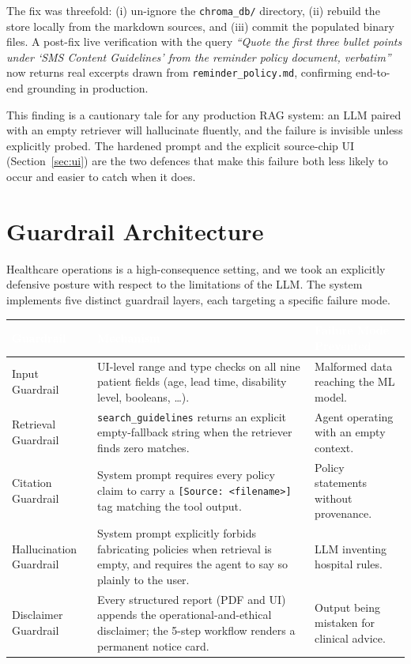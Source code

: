 \documentclass[11pt,a4paper]{article}
\newcommand{\hdrrow}[1]{\textcolor{white}{\textbf{#1}}}
\newcommand{\hdrline}{\rowcolor{navy}}
\begin{document}
The fix was threefold: (i) un-ignore the \texttt{chroma\_db/} directory,
(ii) rebuild the store locally from the markdown sources, and
(iii) commit the populated binary files. A post-fix live verification
with the query \emph{``Quote the first three bullet points under `SMS
Content Guidelines' from the reminder policy document, verbatim''} now
returns real excerpts drawn from \texttt{reminder\_policy.md},
confirming end-to-end grounding in production.

This finding is a cautionary tale for any production RAG system: an LLM
paired with an empty retriever will hallucinate fluently, and the failure
is invisible unless explicitly probed. The hardened prompt and the
explicit source-chip UI (Section~\ref{sec:ui}) are the two defences that
make this failure both less likely to occur and easier to catch when it
does.

\section{Guardrail Architecture}

Healthcare operations is a high-consequence setting, and we took an
explicitly defensive posture with respect to the limitations of the LLM.
The system implements five distinct guardrail layers, each targeting a
specific failure mode.

\begin{tabularx}{\textwidth}{|>{\hsize=0.23\hsize}X|>{\hsize=0.4\hsize}X|X|}
\hline
\hdrline \hdrrow{Guardrail} & \hdrrow{Mechanism} & \hdrrow{Failure Mode Prevented} \\ \hline
Input Guardrail        & UI-level range and type checks on all nine patient fields (age, lead time, disability level, booleans, \ldots).                                          & Malformed data reaching the ML model. \\ \hline
Retrieval Guardrail    & \texttt{search\_guidelines} returns an explicit empty-fallback string when the retriever finds zero matches.                                             & Agent operating with an empty context. \\ \hline
Citation Guardrail     & System prompt requires every policy claim to carry a \texttt{[Source: <filename>]} tag matching the tool output.                                           & Policy statements without provenance. \\ \hline
Hallucination Guardrail & System prompt explicitly forbids fabricating policies when retrieval is empty, and requires the agent to say so plainly to the user.                       & LLM inventing hospital rules. \\ \hline
Disclaimer Guardrail   & Every structured report (PDF and UI) appends the operational-and-ethical disclaimer; the 5-step workflow renders a permanent notice card.              & Output being mistaken for clinical advice. \\ \hline
\end{tabularx}
\end{document}
